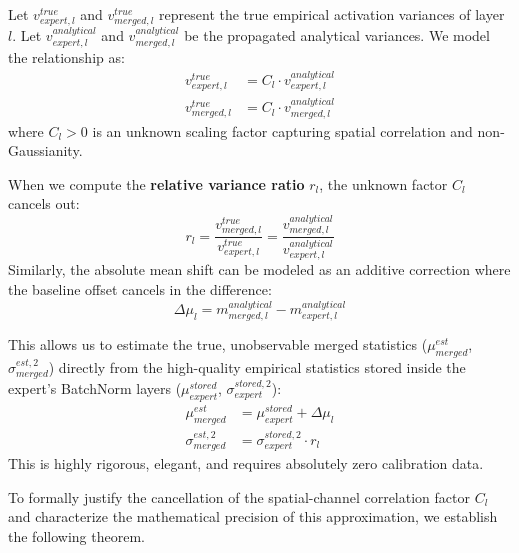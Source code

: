 \documentclass{article}
\theoremstyle{plain}
\theoremstyle{definition}
\theoremstyle{remark}
\begin{document}
Let $v^{true}_{expert, l}$ and $v^{true}_{merged, l}$ represent the true empirical activation variances of layer $l$. Let $v^{analytical}_{expert, l}$ and $v^{analytical}_{merged, l}$ be the propagated analytical variances. We model the relationship as:
\begin{align}
    v^{true}_{expert, l} &= C_l \cdot v^{analytical}_{expert, l} \\
    v^{true}_{merged, l} &= C_l \cdot v^{analytical}_{merged, l}
\end{align}
where $C_l > 0$ is an unknown scaling factor capturing spatial correlation and non-Gaussianity.

When we compute the \textbf{relative variance ratio} $r_l$, the unknown factor $C_l$ cancels out:
\begin{equation}
    r_l = \frac{v^{true}_{merged, l}}{v^{true}_{expert, l}} = \frac{v^{analytical}_{merged, l}}{v^{analytical}_{expert, l}}
\end{equation}
Similarly, the absolute mean shift can be modeled as an additive correction where the baseline offset cancels in the difference:
\begin{equation}
    \Delta \mu_l = m^{analytical}_{merged, l} - m^{analytical}_{expert, l}
\end{equation}

This allows us to estimate the true, unobservable merged statistics ($\mu_{merged}^{est}$, $\sigma_{merged}^{est, 2}$) directly from the high-quality empirical statistics stored inside the expert's BatchNorm layers ($\mu_{expert}^{stored}$, $\sigma_{expert}^{stored, 2}$):
\begin{align}
    \mu_{merged}^{est} &= \mu_{expert}^{stored} + \Delta \mu_l \\
    \sigma_{merged}^{est, 2} &= \sigma_{expert}^{stored, 2} \cdot r_l
\end{align}
This is highly rigorous, elegant, and requires absolutely zero calibration data.

To formally justify the cancellation of the spatial-channel correlation factor $C_l$ and characterize the mathematical precision of this approximation, we establish the following theorem.
\end{document}
